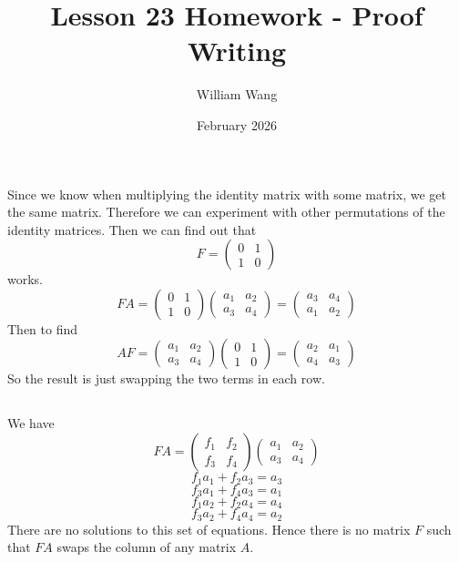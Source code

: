 \documentclass{article}
\title{Lesson 23 Homework - Proof Writing}
\author{William Wang}
\date{February 2026}
\begin{document}
\maketitle


\section{}
\subsection{}
Since we know when multiplying the identity matrix with some matrix, we get the same matrix. Therefore we can experiment with other permutations of the identity matrices. Then we can find out that 
\[F = \begin{pmatrix}
    0&1 \\ 1&0
\end{pmatrix}\]
works. 
\[FA = \begin{pmatrix}
    0&1 \\ 1&0
\end{pmatrix} \begin{pmatrix}
    a_1&a_2 \\ a_3&a_4
\end{pmatrix} = \begin{pmatrix}
    a_3&a_4 \\ a_1&a_2
\end{pmatrix}\]
Then to find 
\[AF = \begin{pmatrix}
    a_1&a_2 \\ a_3&a_4
\end{pmatrix} \begin{pmatrix}
    0&1 \\ 1&0
\end{pmatrix} = \begin{pmatrix}
    a_2&a_1 \\ a_4&a_3
\end{pmatrix}\]
So the result is just swapping the two terms in each row. 
\subsection{}
We have 
\[FA = \begin{pmatrix}
    f_1&f_2 \\ f_3&f_4
\end{pmatrix} \begin{pmatrix}
    a_1&a_2 \\ a_3&a_4
\end{pmatrix}\]
\[f_1a_1 + f_2a_3 = a_3\]
\[f_3a_1+f_4a_3 = a_1\]
\[f_1a_2+f_2a_4 = a_4\]
\[f_3a_2+f_4a_4 = a_2\]
There are no solutions to this set of equations. Hence there is no matrix \(F\) such that \(FA\) swaps the column of any matrix $A$. 
\end{document}
